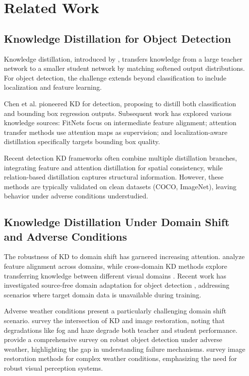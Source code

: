 \section{Related Work}
\label{sec:related}

\subsection{Knowledge Distillation for Object Detection}

Knowledge distillation, introduced by \cite{hinton2015distilling}, transfers knowledge from a large teacher network to a smaller student network by matching softened output distributions. For object detection, the challenge extends beyond classification to include localization and feature learning.

Chen et al. \cite{chen2017learning} pioneered KD for detection, proposing to distill both classification and bounding box regression outputs. Subsequent work has explored various knowledge sources: FitNets \cite{romero2014fitnets} focus on intermediate feature alignment; attention transfer methods \cite{zagoruyko2016paying} use attention maps as supervision; and localization-aware distillation \cite{dai2021general} specifically targets bounding box quality.

Recent detection KD frameworks often combine multiple distillation branches, integrating feature and attention distillation for spatial consistency, while relation-based distillation captures structural information. However, these methods are typically validated on clean datasets (COCO, ImageNet), leaving behavior under adverse conditions understudied.

\subsection{Knowledge Distillation Under Domain Shift and Adverse Conditions}

The robustness of KD to domain shift has garnered increasing attention. \cite{sun2016deep} analyze feature alignment across domains, while cross-domain KD methods explore transferring knowledge between different visual domains \cite{yang2021cross, li2022cross}. Recent work has investigated source-free domain adaptation for object detection \cite{zhang2023source}, addressing scenarios where target domain data is unavailable during training.

Adverse weather conditions present a particularly challenging domain shift scenario. \cite{guo2021meets} survey the intersection of KD and image restoration, noting that degradations like fog and haze degrade both teacher and student performance. \cite{chen2023towards} provide a comprehensive survey on robust object detection under adverse weather, highlighting the gap in understanding failure mechanisms. \cite{liu2023learning} survey image restoration methods for complex weather conditions, emphasizing the need for robust visual perception systems.

